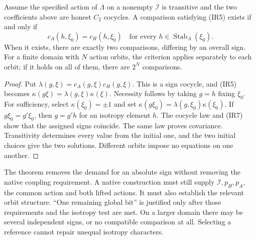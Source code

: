 \begin{proposition}\label{prop:reconciliationcriterion}
Assume the specified action of $\Lambda$ on a nonempty $\mathcal I$ is transitive and the two coefficients above are honest $C_2$ cocycles. A comparison satisfying (IR5) exists if and only if
\begin{equation}
c_A(h,\xi_0)=c_H(h,\xi_0)
\quad\text{for every }h\in\operatorname{Stab}_{\Lambda}(\xi_0).
\tag{IR7}\label{eq:isotropycriterion}
\end{equation}
When it exists, there are exactly two comparisons, differing by an overall sign. For a finite domain with $N$ action orbits, the criterion applies separately to each orbit; if it holds on all of them, there are $2^N$ comparisons.
\end{proposition}
\begin{proof}
Put $\lambda(g,\xi)=c_A(g,\xi)c_H(g,\xi)$. This is a sign cocycle, and (IR5) becomes $\kappa(g\xi)=\lambda(g,\xi)\kappa(\xi)$. Necessity follows by taking $g=h$ fixing $\xi_0$. For sufficiency, select $\kappa(\xi_0)=\pm1$ and set $\kappa(g\xi_0)=\lambda(g,\xi_0)\kappa(\xi_0)$. If $g\xi_0=g'\xi_0$, then $g=g'h$ for an isotropy element $h$. The cocycle law and (IR7) show that the assigned signs coincide. The same law proves covariance. Transitivity determines every value from the initial one, and the two initial choices give the two solutions. Different orbits impose no equations on one another.
\end{proof}
The theorem removes the demand for an absolute sign without removing the native coupling requirement. A native construction must still supply $\mathcal I,p_H,p_A$, the common action and both lifted actions. It must also establish the relevant orbit structure. ``One remaining global bit'' is justified only after those requirements and the isotropy test are met. On a larger domain there may be several independent signs, or no compatible comparison at all. Selecting a reference cannot repair unequal isotropy characters.


